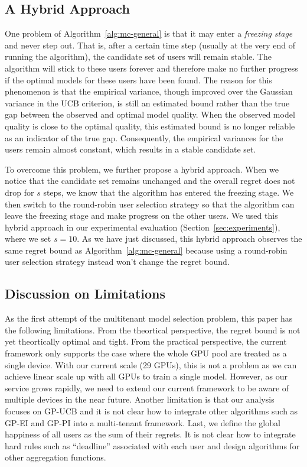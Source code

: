 \documentclass[letterpaper]{vldb}
\begin{document}
\subsection{A Hybrid Approach}

One problem of Algorithm~\ref{alg:mc-general} is that it may enter a \emph{freezing stage} and never step out.
That is, after a certain time step (usually at the very end of running the algorithm), the candidate set of users will remain stable.
The algorithm will stick to these users forever and therefore make no further progress if the optimal models for these users have been found.
The reason for this phenomenon is that the empirical variance, though improved over the Gaussian variance in the UCB criterion, is still an estimated bound rather than the true gap between the observed and optimal model quality.
When the observed model quality is close to the optimal quality, this estimated bound is no longer reliable as an indicator of the true gap.
Consequently, the empirical variances for the users remain almost constant, which results in a stable candidate set.

To overcome this problem, we further propose a hybrid approach.
When we notice that the candidate set remains unchanged and the overall regret does not drop for $s$ steps,
we know that the algorithm has entered the freezing stage.
We then switch to the round-robin user selection strategy so that the algorithm can leave the freezing stage and make progress on the other users.
We used this hybrid approach in our experimental evaluation (Section~\ref{sec:experiments}), where we set $s=10$.
As we have just discussed, this hybrid approach observes the same regret bound as Algorithm~\ref{alg:mc-general} because using a round-robin user selection strategy instead won't change the regret bound.


\subsection{Discussion on Limitations} \label{sec:limitations}

As the first attempt
of the multitenant model selection problem,
this paper has the following limitations.
From the theortical perspective, the regret bound
is not yet theortically optimal and tight.
From the practical perspective,
the current framework only supports the case where
the whole GPU pool are treated as a single device.
With our current scale (29 GPUs), this is not
a problem as we can achieve linear scale up
with all GPUs to train a single model. However, as our service grows
rapidly, we need to extend our current framework
to be aware of multiple devices in the near future.
Another limitation is that our
analysis focuses on GP-UCB and it is not clear
how to integrate other algorithms such as
GP-EI and GP-PI into a multi-tenant 
framework. Last, we define the global
happiness of all users as the sum 
of their regrets. It is not clear how to
integrate hard rules such as ``deadline''
associated with each user and design
algorithms for other aggregation functions.
\end{document}
